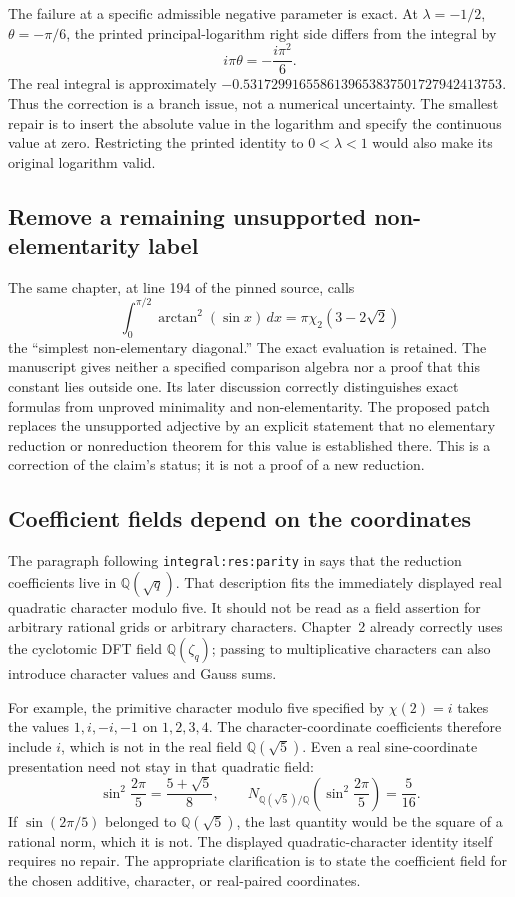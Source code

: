 \documentclass[11pt,letterpaper]{article}
\numberwithin{equation}{section}
\theoremstyle{plain}
\theoremstyle{definition}
\theoremstyle{remark}
\begin{document}
The failure at a specific admissible negative parameter is exact.  At
$\lambda=-1/2$, $\theta=-\pi/6$, the printed principal-logarithm
right side differs from the integral by
\[
 i\pi\theta=-\frac{i\pi^2}{6}.
\]
The real integral is approximately
$-0.5317299165586139653837501727942413753$.
Thus the correction is a branch issue, not a numerical uncertainty.
The smallest repair is to insert the absolute value in the logarithm
and specify the continuous value at zero.  Restricting the printed
identity to $0<\lambda<1$ would also make its original logarithm valid.

\subsection{Remove a remaining unsupported non-elementarity label}

The same chapter, at line 194 of the pinned source, calls
\[
 \int_0^{\pi/2}\arctan^2(\sin x)\,dx
       =\pi\chi_2(3-2\sqrt2)
\]
the ``simplest non-elementary diagonal.''  The exact evaluation is
retained.  The manuscript gives neither a specified comparison algebra
nor a proof that this constant lies outside one.  Its later discussion
correctly distinguishes exact formulas from unproved minimality and
non-elementarity.  The proposed patch replaces the unsupported adjective
by an explicit statement that no elementary reduction or nonreduction
theorem for this value is established there.  This is a correction of
the claim's status; it is not a proof of a new reduction.

\subsection{Coefficient fields depend on the coordinates}

The paragraph following \texttt{integral:res:parity} in
 says that the reduction coefficients
live in $\mathbb Q(\sqrt q)$.  That description fits the immediately
displayed real quadratic character modulo five.  It should not be read
as a field assertion for arbitrary rational grids or arbitrary
characters.  Chapter~2 already correctly uses the cyclotomic DFT field
$\mathbb Q(\zeta_q)$; passing to multiplicative characters can also
introduce character values and Gauss sums.

For example, the primitive character modulo five specified by
$\chi(2)=i$ takes the values $1,i,-i,-1$ on $1,2,3,4$.
The character-coordinate coefficients therefore include $i$, which is
not in the real field $\mathbb Q(\sqrt5)$.  Even a real sine-coordinate
presentation need not stay in that quadratic field:
\[
 \sin^2\frac{2\pi}{5}=\frac{5+\sqrt5}{8},\qquad
 N_{\mathbb Q(\sqrt5)/\mathbb Q}
      \left(\sin^2\frac{2\pi}{5}\right)=\frac5{16}.
\]
If $\sin(2\pi/5)$ belonged to $\mathbb Q(\sqrt5)$, the last
quantity would be the square of a rational norm, which it is not.
The displayed quadratic-character identity itself requires no repair.
The appropriate clarification is to state the coefficient field for
the chosen additive, character, or real-paired coordinates.
\end{document}

